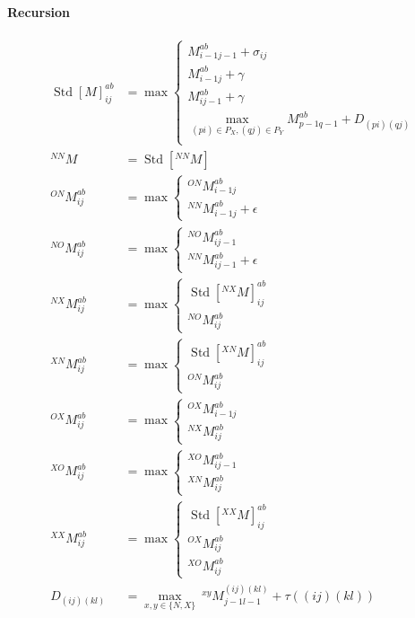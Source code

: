 \documentclass{article}
\newcommand{\N}[1]{\operatorname{Std}[#1]}
\begin{document}
\paragraph{Recursion}
\begin{align*}
  \N{M}^{ab}_{ij} &= 
  \max
  \begin{cases}
    M^{ab}_{i-1j-1} + \sigma_{ij}\\
    M^{ab}_{i-1j} + \gamma\\
    M^{ab}_{ij-1} + \gamma\\
    \max_{(pi)\in P_X,(qj)\in P_Y} M^{ab}_{p-1q-1} + D_{(pi)(qj)}\\
  \end{cases}\\
  ^{NN}M &= \N{^{NN}M}\\
  ^{ON}M^{ab}_{ij} &= \max 
  \begin{cases}
    ^{ON}M^{ab}_{i-1j}\\
    ^{NN}M^{ab}_{i-1j} + \epsilon
  \end{cases}\\
  ^{NO}M^{ab}_{ij} &= \max 
  \begin{cases}
    ^{NO}M^{ab}_{ij-1}\\
    ^{NN}M^{ab}_{ij-1} + \epsilon
  \end{cases}\\
  ^{NX}M^{ab}_{ij} &= \max 
  \begin{cases}
    \N{^{NX}M}^{ab}_{ij}\\
    ^{NO}M^{ab}_{ij}
  \end{cases}\\
  ^{XN}M^{ab}_{ij} &= \max 
  \begin{cases}
    \N{^{XN}M}^{ab}_{ij}\\
    ^{ON}M^{ab}_{ij}
  \end{cases}\\
  ^{OX}M^{ab}_{ij} &= \max 
  \begin{cases}
    ^{OX}M^{ab}_{i-1j}\\
    ^{NX}M^{ab}_{ij}
  \end{cases}\\
  ^{XO}M^{ab}_{ij} &= \max 
  \begin{cases}
    ^{XO}M^{ab}_{ij-1}\\
    ^{XN}M^{ab}_{ij}
  \end{cases}\\
  ^{XX}M^{ab}_{ij} &= \max 
  \begin{cases}
    \N{^{XX}M}^{ab}_{ij}\\
    ^{OX}M^{ab}_{ij}\\
    ^{XO}M^{ab}_{ij}
  \end{cases}\\
  D_{(ij)(kl)} &= \max_{x,y\in\{N,X\}}\ ^{xy}M^{(ij)(kl)}_{j-1l-1} + \tau((ij)(kl))
\end{align*}
\end{document}
